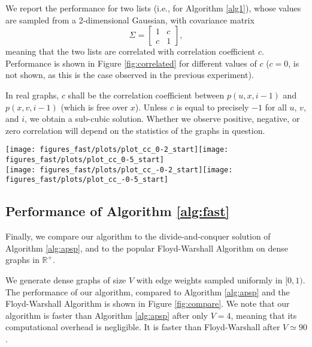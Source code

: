 \documentclass[a4paper,10pt]{article}
\begin{document}
We report the performance for two lists (i.e., for Algorithm \ref{alg1}), whose values are sampled from a 2-dimensional Gaussian, with covariance matrix
\begin{equation}
 \Sigma = \left[ \begin{array}{cc} 1 & c \\ c & 1\end{array} \right],
\end{equation}
meaning that the two lists are correlated with correlation coefficient $c$. Performance is shown in Figure \ref{fig:correlated} for different values of $c$ ($c=0$, is not shown, as this is the case observed in the previous experiment).

In real graphs, $c$ shall be the correlation coefficient between $p(u,x,i-1)$ and $p(x,v,i-1)$ (which is free over $x$). Unless $c$ is equal to precisely $-1$ for all $u$, $v$, and $i$, we obtain a sub-cubic solution. Whether we observe positive, negative, or zero correlation will depend on the statistics of the graphs in question.

\begin{figure*}
 \begin{center}
  \texttt{[image: figures\_fast/plots/plot\_cc\_0-2\_start]}\texttt{[image: figures\_fast/plots/plot\_cc\_0-5\_start]}\\\texttt{[image: figures\_fast/plots/plot\_cc\_-0-2\_start]}\texttt{[image: figures\_fast/plots/plot\_cc\_-0-5\_start]}\end{center}
\caption{Performance of our algorithm for different correlation coefficients. The top three plots show positive correlation, the bottom three show negative correlation. Correlation coefficients of $c = 1.0$ and $c = -1.0$ capture precisely the best and worst-case performance (respectively) of our algorithm.}
\label{fig:correlated}
\end{figure*}

\subsection{Performance of Algorithm \ref{alg:fast}}

Finally, we compare our algorithm to the divide-and-conquer solution of Algorithm \ref{alg:apsp}, and to the popular Floyd-Warshall Algorithm \cite{floyd} on dense graphs in $\mathbb R^+$.

We generate dense graphs of size $V$ with edge weights sampled uniformly in $[ 0, 1 )$. The performance of our algorithm, compared to Algorithm \ref{alg:apsp} and the Floyd-Warshall Algorithm is shown in Figure \ref{fig:compare}. We note that our algorithm is faster than Algorithm \ref{alg:apsp} after only $V=4$, meaning that its computational overhead is negligible. It is faster than Floyd-Warshall after $V\simeq 90$.
\end{document}
